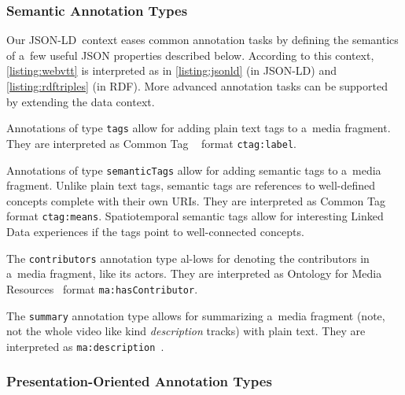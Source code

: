 \documentclass{sig-alternate}
\def\JSONLD{\mbox{JSON-LD}}
\begin{document}
\subsubsection{Semantic Annotation Types}

Our \JSONLD\ context eases common annotation tasks
by defining the semantics of a~few useful JSON properties described below.
According to this context, \autoref{listing:webvtt} is interpreted as in
\autoref{listing:jsonld} (in \JSONLD) and \autoref{listing:rdftriples} (in RDF).
More advanced annotation tasks can be supported by extending the data context.

\begin{description}[leftmargin=*]
  \item[Plain Text Tags] Annotations of type
  \texttt{tags} allow for add\-ing plain text tags
  to a~media fragment.
  They are interpreted as Common Tag%
  ~\cite{commontag2009spec} format \texttt{ctag:label}.

  \item[Semantic Tags] Annotations of type
  \texttt{semanticTags} allow for adding semantic tags
  to a~media fragment.
  Unlike plain text tags, semantic tags are references to
  well-defined concepts complete with their own URIs.
  They are interpreted as Common Tag%
  ~\cite{commontag2009spec} format \texttt{ctag:means}.
  Spatiotemporal semantic tags allow for
  interesting Linked Data experiences
  if the tags point to well-connected concepts.

  \item[Contributors] The \texttt{contributors} annotation type
  al-\linebreak lows for denoting the contributors in a~media fragment, like its actors.
  They are interpreted as
  Ontology for Media Resources~\cite{lee2012mediaontology}
  format \texttt{ma:hasContributor}.

  \item[Summary] The \texttt{summary} annotation type
  allows for summarizing a~media fragment
  (note, not the whole video like kind \emph{description} tracks)
  with plain text.
  They are interpreted as  
  \texttt{ma:description}~\cite{lee2012mediaontology}.
\end{description}

\subsubsection{Presentation-Oriented Annotation Types}
\end{document}
